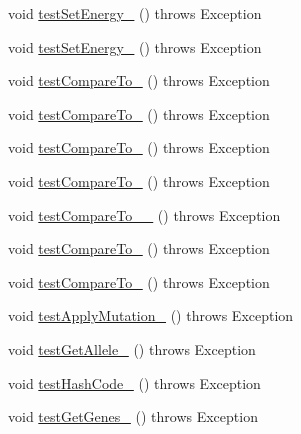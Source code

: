 \begin{DoxyCompactItemize}
\item 
void \hyperlink{classorg_1_1jgap_1_1impl_1_1_composite_gene_test_aeefd97ee4a4d485e40117a0775723665}{test\-Set\-Energy\-\_} ()  throws Exception 
\item 
void \hyperlink{classorg_1_1jgap_1_1impl_1_1_composite_gene_test_a013bf371bd1049433e99abadf29cdcdf}{test\-Set\-Energy\-\_} ()  throws Exception 
\item 
void \hyperlink{classorg_1_1jgap_1_1impl_1_1_composite_gene_test_aff77c831d35b221df23b0809ac477c7b}{test\-Compare\-To\-\_} ()  throws Exception 
\item 
void \hyperlink{classorg_1_1jgap_1_1impl_1_1_composite_gene_test_aebbb1ef31d8e9eba385ee1ae980e39f6}{test\-Compare\-To\-\_} ()  throws Exception 
\item 
void \hyperlink{classorg_1_1jgap_1_1impl_1_1_composite_gene_test_af0c4f7eca799736976c0b33459e92f38}{test\-Compare\-To\-\_} ()  throws Exception 
\item 
void \hyperlink{classorg_1_1jgap_1_1impl_1_1_composite_gene_test_a65fdfdf8340539e34d2299baf0938d14}{test\-Compare\-To\-\_} ()  throws Exception 
\item 
void \hyperlink{classorg_1_1jgap_1_1impl_1_1_composite_gene_test_ac4ad37a79efaae5f15bbb1cbd6ad3793}{test\-Compare\-To\-\_\-\_} ()  throws Exception 
\item 
void \hyperlink{classorg_1_1jgap_1_1impl_1_1_composite_gene_test_a18eb5d638f8441fb555dc86d7bcdfafd}{test\-Compare\-To\-\_} ()  throws Exception 
\item 
void \hyperlink{classorg_1_1jgap_1_1impl_1_1_composite_gene_test_a3dc0b7707c453efc03db91c0e812f210}{test\-Compare\-To\-\_} ()  throws Exception 
\item 
void \hyperlink{classorg_1_1jgap_1_1impl_1_1_composite_gene_test_ac492fac200a650ede05d889f310934c8}{test\-Apply\-Mutation\-\_} ()  throws Exception 
\item 
void \hyperlink{classorg_1_1jgap_1_1impl_1_1_composite_gene_test_a8ea542376be85fe399dc9bb41a8bc35c}{test\-Get\-Allele\-\_} ()  throws Exception 
\item 
void \hyperlink{classorg_1_1jgap_1_1impl_1_1_composite_gene_test_a16d92b95d6741115829f5ec4c21b854c}{test\-Hash\-Code\-\_} ()  throws Exception 
\item 
void \hyperlink{classorg_1_1jgap_1_1impl_1_1_composite_gene_test_a3a8ec16032bc05ae64c6b38c177173fa}{test\-Get\-Genes\-\_} ()  throws Exception 
\end{DoxyCompactItemize}
